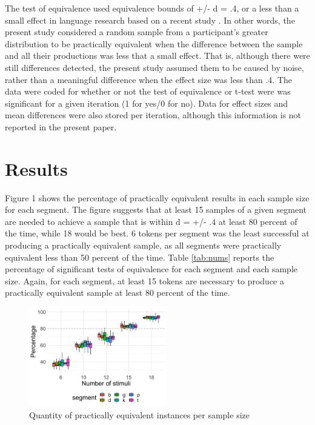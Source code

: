\documentclass[
  a4paper,
  11pt,
  twocolumn]{article}
\begin{document}
The test of equivalence used equivalence bounds of +/- d = .4, or a less
than a small effect in language research based on a recent study
\cite{plonsky2014big}. In other words, the present study considered a
random sample from a participant's greater distribution to be
practically equivalent when the difference between the sample and all
their productions was less that a small effect. That is, although there
were still differences detected, the present study assumed them to be
caused by noise, rather than a meaningful difference when the effect
size was less than .4. The data were coded for whether or not the test
of equivalence or t-test were was significant for a given iteration (1
for yes/0 for no). Data for effect sizes and mean differences were also
stored per iteration, although this information is not reported in the
present paper.

\section{Results}

Figure 1 shows the percentage of practically equivalent results in each
sample size for each segment. The figure suggests that at least 15
samples of a given segment are needed to achieve a sample that is within
d = +/- .4 at least 80 percent of the time, while 18 would be best. 6
tokens per segment was the least successful at producing a practically
equivalent sample, as all segments were practically equivalent less than
50 percent of the time. Table \ref{tab:nums} reports the percentage of
significant tests of equivalence for each segment and each sample size.
Again, for each segment, at least 15 tokens are necessary to produce a
practically equivalent sample at least 80 percent of the time.

\begin{figure}[!ht]
  \caption{Quantity of practically equivalent instances per sample size}
  \label{fig:stim}
  \begin{center}
  \includegraphics[width=6cm]{./includes/figures/tost.png}
  \end{center}
\end{figure}
\end{document}
